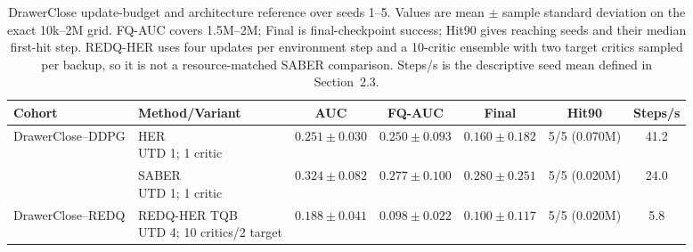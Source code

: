 \begin{table}[t]
\centering
\small
\setlength{\tabcolsep}{4pt}
\begin{tabular}{llccccc}
\toprule
Cohort & Method/Variant & AUC & FQ-AUC & Final & Hit90 & Steps/s \\
\midrule
DrawerClose--DDPG & \shortstack[l]{HER\\UTD 1; 1 critic} & $0.251 \pm 0.030$ & $0.250 \pm 0.093$ & $0.160 \pm 0.182$ & 5/5 (0.070M) & 41.2 \\
 & \shortstack[l]{SABER\\UTD 1; 1 critic} & $0.324 \pm 0.082$ & $0.277 \pm 0.100$ & $0.280 \pm 0.251$ & 5/5 (0.020M) & 24.0 \\
DrawerClose--REDQ & \shortstack[l]{REDQ-HER TQB\\UTD 4; 10 critics/2 target} & $0.188 \pm 0.041$ & $0.098 \pm 0.022$ & $0.100 \pm 0.117$ & 5/5 (0.020M) & 5.8 \\
\bottomrule
\end{tabular}
\caption{DrawerClose update-budget and architecture reference over seeds 1--5. Values are mean $\pm$ sample standard deviation on the exact 10k--2M grid. FQ-AUC covers 1.5M--2M; Final is final-checkpoint success; Hit90 gives reaching seeds and their median first-hit step. REDQ-HER uses four updates per environment step and a 10-critic ensemble with two target critics sampled per backup, so it is not a resource-matched SABER comparison. Steps/s is the descriptive seed mean defined in Section~2.3.}
\label{tab:supp-drawerclose-redq}
\end{table}
